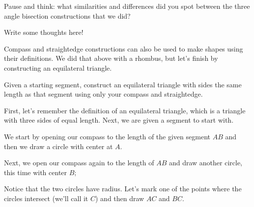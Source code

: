 \documentclass{ximera}
\begin{document}
\begin{question}
Pause and think: what similarities and differences did you spot between the three angle bisection constructions that we did?
\begin{freeResponse}
Write some thoughts here!
\end{freeResponse}
\end{question}

Compass and straightedge constructions can also be used to make shapes using their definitions. We did that above with a rhombus, but let's finish by constructing an equilateral triangle.
\begin{example}
Given a starting segment, construct an equilateral triangle with sides the same length as that segment using only your compass and straightedge.

First, let's remember the definition of an equilateral triangle, which is a triangle with three sides of equal length. Next, we are given a segment to start with.
\begin{image}
\end{image}
We start by opening our compass to the length of the given segment $AB$ and then we draw a circle with center at $A$.
\begin{image}
\end{image}
Next, we open our compass again to the length of $AB$ and draw another circle, this time with center $B$;
\begin{image}
\end{image}
Notice that the two circles have  radius. Let's mark one of the points where the circles intersect (we'll call it $C$) and then draw $AC$ and $BC$.

\end{example}
\end{document}
